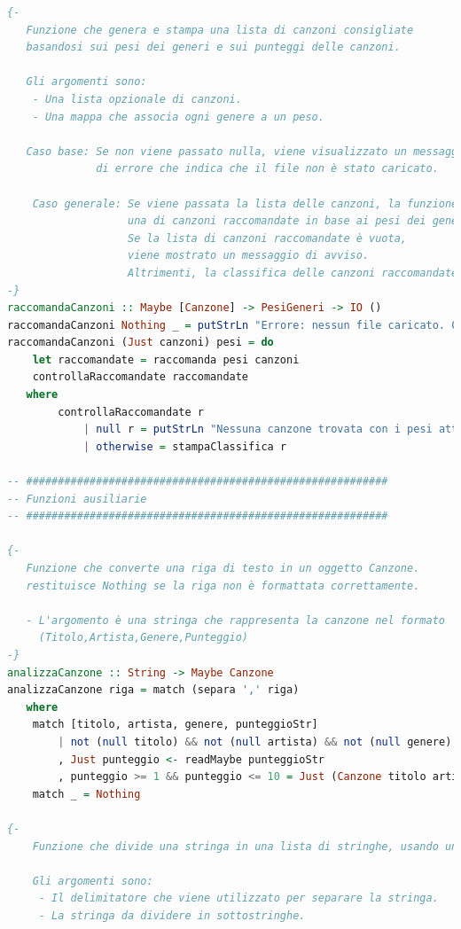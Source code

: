\documentclass[a4paper,11pt]{article}
\begin{document}
\begin{lstlisting}[language=Haskell]
{-
   Funzione che genera e stampa una lista di canzoni consigliate
   basandosi sui pesi dei generi e sui punteggi delle canzoni.

   Gli argomenti sono:
    - Una lista opzionale di canzoni.
    - Una mappa che associa ogni genere a un peso.

   Caso base: Se non viene passato nulla, viene visualizzato un messaggio
              di errore che indica che il file non è stato caricato.

    Caso generale: Se viene passata la lista delle canzoni, la funzione ne genera
                   una di canzoni raccomandate in base ai pesi dei generi.
                   Se la lista di canzoni raccomandate è vuota,
                   viene mostrato un messaggio di avviso.
                   Altrimenti, la classifica delle canzoni raccomandate viene stampata.
-}
raccomandaCanzoni :: Maybe [Canzone] -> PesiGeneri -> IO ()
raccomandaCanzoni Nothing _ = putStrLn "Errore: nessun file caricato. Carica un file prima di continuare."
raccomandaCanzoni (Just canzoni) pesi = do
    let raccomandate = raccomanda pesi canzoni
    controllaRaccomandate raccomandate
   where
        controllaRaccomandate r
            | null r = putStrLn "Nessuna canzone trovata con i pesi attuali."
            | otherwise = stampaClassifica r

-- #########################################################
-- Funzioni ausiliarie
-- #########################################################

{-
   Funzione che converte una riga di testo in un oggetto Canzone.
   restituisce Nothing se la riga non è formattata correttamente.

   - L'argomento è una stringa che rappresenta la canzone nel formato
     (Titolo,Artista,Genere,Punteggio)
-}
analizzaCanzone :: String -> Maybe Canzone
analizzaCanzone riga = match (separa ',' riga)
   where
    match [titolo, artista, genere, punteggioStr]
        | not (null titolo) && not (null artista) && not (null genere) && not (null punteggioStr)
        , Just punteggio <- readMaybe punteggioStr
        , punteggio >= 1 && punteggio <= 10 = Just (Canzone titolo artista genere punteggio)
    match _ = Nothing

{-
    Funzione che divide una stringa in una lista di stringhe, usando un delimitatore.

    Gli argomenti sono:
     - Il delimitatore che viene utilizzato per separare la stringa.
     - La stringa da dividere in sottostringhe.


\end{lstlisting}
\end{document}
